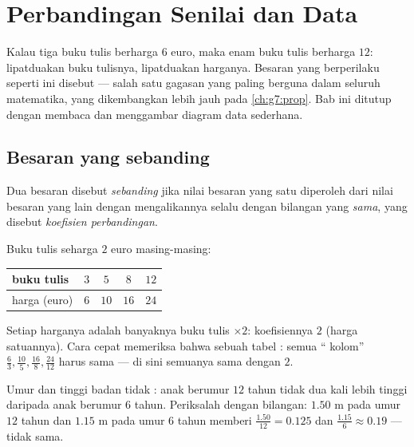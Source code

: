 \chapter{Perbandingan Senilai dan Data}\label{ch:g6:propdata}

Kalau tiga buku tulis berharga $6$ euro, maka enam buku tulis berharga
$12$: lipatduakan buku tulisnya, lipatduakan harganya. Besaran yang
berperilaku seperti ini disebut \emph{} --- salah satu
gagasan yang paling berguna dalam seluruh matematika, yang dikembangkan
lebih jauh pada \cref{ch:g7:prop}. Bab ini ditutup dengan membaca dan
menggambar diagram data sederhana.

\section{Besaran yang sebanding}

\begin{definition}\label{def:g6:propdata:def}
Dua besaran disebut \emph{sebanding} jika
nilai besaran yang satu diperoleh dari nilai besaran yang lain dengan
mengalikannya selalu dengan bilangan yang \emph{sama}, yang disebut
\emph{koefisien perbandingan}.
\end{definition}

\begin{example}\label{ex:g6:propdata:table}
Buku tulis seharga $2$ euro masing-masing:
\begin{center}
\renewcommand{\arraystretch}{1.3}
\begin{tabular}{l|cccc}
buku tulis & $3$ & $5$ & $8$ & $12$ \\
\hline
harga (euro) & $6$ & $10$ & $16$ & $24$ \\
\end{tabular}
\end{center}
Setiap harganya adalah banyaknya buku tulis $\times 2$: koefisiennya
$2$ (harga satuannya). Cara cepat memeriksa bahwa sebuah tabel
: semua `` kolom'' $\frac{6}{3}, \frac{10}{5},
\frac{16}{8}, \frac{24}{12}$ harus sama --- di sini semuanya sama dengan $2$.
\end{example}

\begin{example}\label{ex:g6:propdata:nonexample}
Umur dan tinggi badan tidak : anak berumur $12$ tahun tidak
dua kali lebih tinggi daripada anak berumur $6$ tahun. Periksalah
dengan bilangan: $1.50$ m pada umur $12$ tahun dan $1.15$ m pada umur
$6$ tahun memberi  $\frac{1.50}{12} = 0.125$ dan
$\frac{1.15}{6} \approx 0.19$ --- tidak sama.
\end{example}

